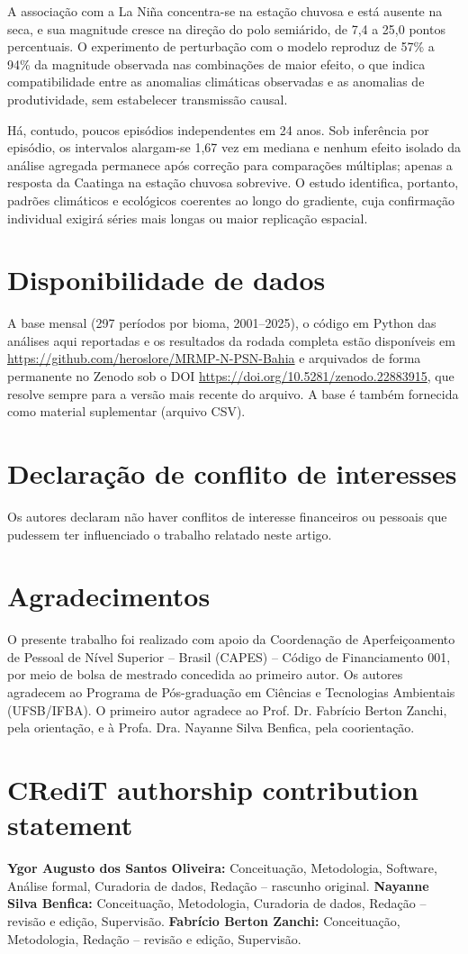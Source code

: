 \documentclass[a4paper,fleqn]{cas-sc}
\begin{document}
A associação com a La Niña concentra-se na estação chuvosa e está ausente na seca, e sua magnitude cresce na direção do polo semiárido, de 7,4 a 25,0 pontos percentuais. O experimento de perturbação com o modelo reproduz de 57\% a 94\% da magnitude observada nas combinações de maior efeito, o que indica compatibilidade entre as anomalias climáticas observadas e as anomalias de produtividade, sem estabelecer transmissão causal.

Há, contudo, poucos episódios independentes em 24 anos. Sob inferência por episódio, os intervalos alargam-se 1,67 vez em mediana e nenhum efeito isolado da análise agregada permanece após correção para comparações múltiplas; apenas a resposta da Caatinga na estação chuvosa sobrevive. O estudo identifica, portanto, padrões climáticos e ecológicos coerentes ao longo do gradiente, cuja confirmação individual exigirá séries mais longas ou maior replicação espacial.

\section*{Disponibilidade de dados}
A base mensal (297 períodos por bioma, 2001--2025), o código em Python das análises aqui reportadas e os resultados da rodada completa estão disponíveis em \url{https://github.com/heroslore/MRMP-N-PSN-Bahia} e arquivados de forma permanente no Zenodo sob o DOI \url{https://doi.org/10.5281/zenodo.22883915}, que resolve sempre para a versão mais recente do arquivo. A base é também fornecida como material suplementar (arquivo CSV).

\section*{Declaração de conflito de interesses}
Os autores declaram não haver conflitos de interesse financeiros ou pessoais que pudessem ter influenciado o trabalho relatado neste artigo.

\section*{Agradecimentos}
O presente trabalho foi realizado com apoio da Coordenação de Aperfeiçoamento de Pessoal de Nível Superior -- Brasil (CAPES) -- Código de Financiamento 001, por meio de bolsa de mestrado concedida ao primeiro autor. Os autores agradecem ao Programa de Pós-graduação em Ciências e Tecnologias Ambientais (UFSB/IFBA). O primeiro autor agradece ao Prof. Dr. Fabrício Berton Zanchi, pela orientação, e à Profa. Dra. Nayanne Silva Benfica, pela coorientação.

\section*{CRediT authorship contribution statement}
\textbf{Ygor Augusto dos Santos Oliveira:} Conceituação, Metodologia, Software, Análise formal, Curadoria de dados, Redação -- rascunho original. \textbf{Nayanne Silva Benfica:} Conceituação, Metodologia, Curadoria de dados, Redação -- revisão e edição, Supervisão. \textbf{Fabrício Berton Zanchi:} Conceituação, Metodologia, Redação -- revisão e edição, Supervisão.



\end{document}

